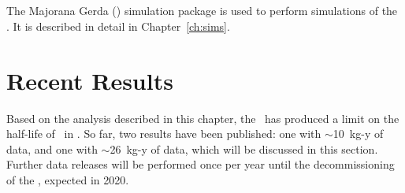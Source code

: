 \documentclass[/main.tex]{subfiles}
\begin{document}
\subsection{\Mage}
The Majorana Gerda (\Mage) simulation package is used to perform simulations of the \MJD\cite{mage2011}.
It is described in detail in Chapter~\ref{ch:sims}.

\section{Recent Results}
Based on the analysis described in this chapter, the \MJD\ has produced a limit on the half-life of \znbb\ in .
So far, two results have been published: one with $\sim$10~kg-y of data\cite{mjd2018}, and one with $\sim$26~kg-y of data\cite{mjd2019}, which will be discussed in this section.
Further data releases will be performed once per year until the decommissioning of the \MJD, expected in 2020.
\end{document}

